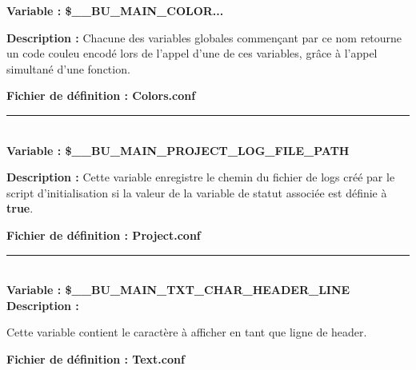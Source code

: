 \documentclass[a4paper,10pt]{article}
\begin{document}
\textbf{Variable : \color{orange}\$\_\_BU\_MAIN\_COLOR...}\\[1\baselineskip]

\begin{justify}
    \textbf{Description :} Chacune des variables globales commençant par ce nom retourne un code couleu encodé lors de l'appel d'une de ces variables, grâce à l'appel simultané d'une fonction.
\end{justify}

\textbf{Fichier de définition : \color{lime}Colors.conf}\\[1\baselineskip]



\color{orange}\par\noindent\rule{\textwidth}{0.4pt}\color{white}\\[1\baselineskip]

\textbf{Variable : \color{orange}\$\_\_BU\_MAIN\_PROJECT\_LOG\_FILE\_PATH}\\[1\baselineskip]

\begin{justify}
    \textbf{Description :} Cette variable enregistre le chemin du fichier de logs créé par le script d'initialisation si la valeur de la variable de statut associée est définie à \textbf{\color{gray}true}.
\end{justify}

\textbf{Fichier de définition : \color{lime}Project.conf} \\[1\baselineskip]



\color{orange}\par\noindent\rule{\textwidth}{0.4pt}\color{white}\\[1\baselineskip]

\textbf{Variable : \color{orange}\$\_\_BU\_MAIN\_TXT\_CHAR\_HEADER\_LINE}\\[1\baselineskip]

\textbf{Description :}
\begin{justify}
    Cette variable contient le caractère à afficher en tant que ligne de header.
\end{justify}

\textbf{Fichier de définition : \color{lime}Text.conf}\\[1\baselineskip]



\end{document}
